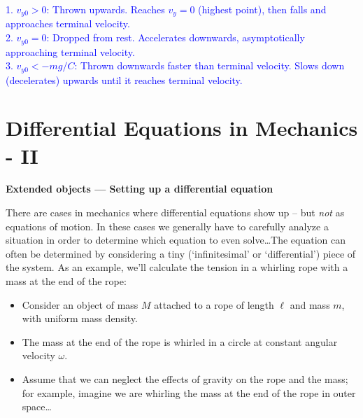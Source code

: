\documentclass[11pt, letterpaper, openany]{book}
\newenvironment{exercise}[1][Exercise]{%
  \tcolorbox[blanker, breakable, left=1em,
    before skip=1em, after skip=1em,
    borderline west={3pt}{0pt}{PhysNavy},
    colback=PhysCream,
    before upper={\textcolor{PhysNavy}{\sffamily\bfseries #1:}\space}
  ]%
}{%
  \endtcolorbox%
}
\begin{document}
\begin{exercise}[Exercise 2]
\begin{enumerate}[label=(\alph*)]
    \begin{center}
    \end{center}
    \textcolor{blue}{
    1. $v_{y0} > 0$: Thrown upwards. Reaches $v_y = 0$ (highest point), then falls and approaches terminal velocity. \\
    2. $v_{y0} = 0$: Dropped from rest. Accelerates downwards, asymptotically approaching terminal velocity. \\
    3. $v_{y0} < -mg/C$: Thrown downwards faster than terminal velocity. Slows down (decelerates) upwards until it reaches terminal velocity.
    }
\end{enumerate}
\end{exercise}

\chapter{Differential Equations in Mechanics - II}
\textbf{Extended objects --- Setting up a differential equation}

There are cases in mechanics where differential equations show up -- but \textit{not} as equations of motion. In these cases we generally have to carefully analyze a situation in order to determine which equation to even solve\dots The equation can often be determined by considering a tiny (`infinitesimal' or `differential') piece of the system. As an example, we'll calculate the tension in a whirling rope with a mass at the end of the rope:
\begin{itemize}
    \item Consider an object of mass $M$ attached to a rope of length $\ell$ and mass $m$, with uniform mass density.
    \item The mass at the end of the rope is whirled in a circle at constant angular velocity $\omega$.
    \item Assume that we can neglect the effects of gravity on the rope and the mass; for example, imagine we are whirling the mass at the end of the rope in outer space\dots
\end{itemize}
\end{document}
